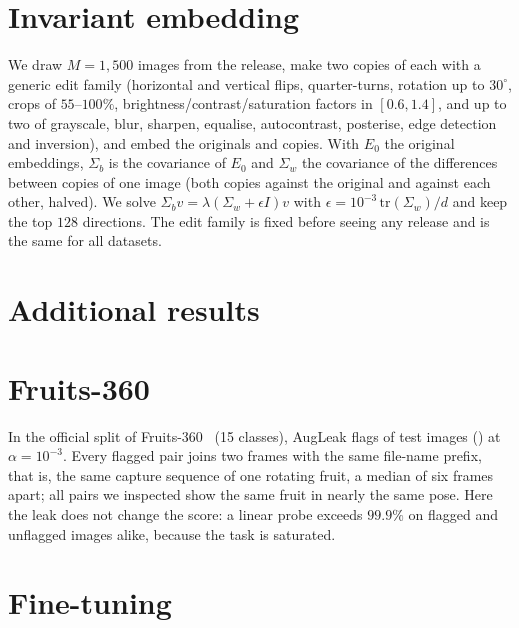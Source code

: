 \section{Invariant embedding}
\label{app:invariant}

We draw $M=1{,}500$ images from the release, make two copies of each with a generic edit family (horizontal and vertical flips, quarter-turns, rotation up to $30^\circ$, crops of $55$--$100\%$, brightness/contrast/saturation factors in $[0.6,1.4]$, and up to two of grayscale, blur, sharpen, equalise, autocontrast, posterise, edge detection and inversion), and embed the originals and copies. With $E_0$ the original embeddings, $\Sigma_b$ is the covariance of $E_0$ and $\Sigma_w$ the covariance of the differences between copies of one image (both copies against the original and against each other, halved). We solve $\Sigma_b v=\lambda(\Sigma_w+\epsilon I)v$ with $\epsilon=10^{-3}\,\mathrm{tr}(\Sigma_w)/d$ and keep the top $128$ directions. The edit family is fixed before seeing any release and is the same for all datasets.

\section{Additional results}
\label{app:orig}
\label{app:backbones}











\FloatBarrier
\section{Fruits-360}
\label{app:fruits}
In the official split of Fruits-360~\citep{muresan2018fruits} (15 classes), AugLeak flags \numFRflag{} of \numFRntest{} test images (\numFRflagPct{}) at $\alpha=10^{-3}$. Every flagged pair joins two frames with the same file-name prefix, that is, the same capture sequence of one rotating fruit, a median of six frames apart; all \numFRyes{} pairs we inspected show the same fruit in nearly the same pose. Here the leak does not change the score: a linear probe exceeds $99.9\%$ on flagged and unflagged images alike, because the task is saturated.


\FloatBarrier
\section{Fine-tuning}
\label{app:finetune}
